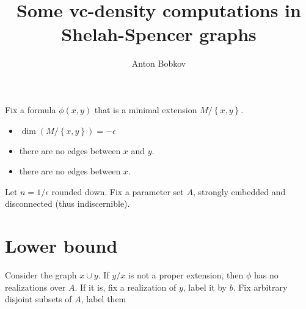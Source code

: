 \documentclass{amsart}
\newcommand{\curly}[1]{\left\{#1\right\}}
\newcommand{\paren}[1]{\left(#1\right)}
\DeclareMathOperator{\dim}{dim}
\begin{document}
\title{Some vc-density computations in Shelah-Spencer graphs}
\author{Anton Bobkov}

Fix a formula $\phi(x, y)$ that is a minimal extension $M/\curly{x,y}$. 
\begin{itemize}
	\item $\dim \paren{M/\curly{x,y}} = -\epsilon$
	\item there are no edges between $x$ and $y$.
	\item there are no edges between $x$.
\end{itemize}

Let $n = 1/\epsilon$ rounded down.
Fix a parameter set $A$, strongly embedded and disconnected (thus indiscernible).

\section{Lower bound}

Consider the graph $x \cup y$. If $y/x$ is not a proper extension, then $\phi$ has no realizations over $A$. If it is, fix a realization of $y$, label it by $b$. Fix arbitrary disjoint subsets of $A$, label them $$
\end{document}
